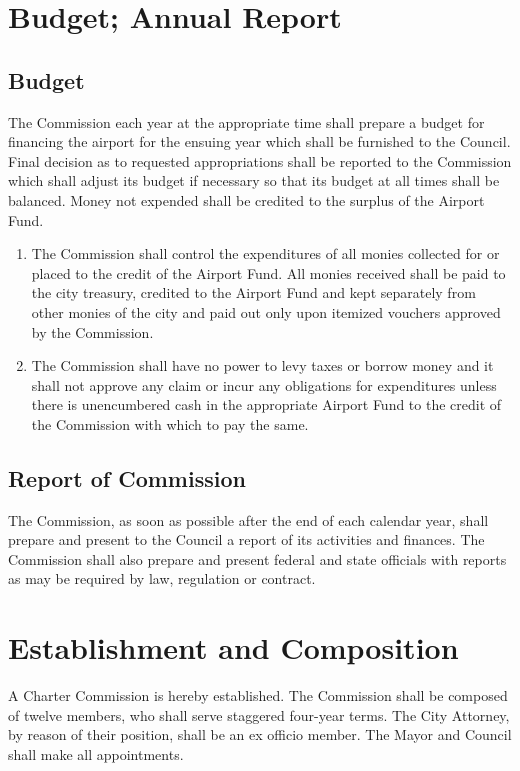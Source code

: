 \section{Budget; Annual Report}
\subsection{Budget}
The Commission each year at the appropriate time shall prepare a budget for financing the airport for the ensuing year which shall be furnished to the Council.  Final decision as to requested appropriations shall be reported to the Commission which shall adjust its budget if necessary so that its budget at all times shall be balanced.  Money not expended shall be credited to the surplus of the Airport Fund.
\begin{enumerate}
    \item The Commission shall control the expenditures of all monies collected for or placed to the credit of the Airport Fund.  All monies received shall be paid to the city treasury, credited to the Airport Fund and kept separately from other monies of the city and paid out only upon itemized vouchers approved by the Commission.
    \item The Commission shall have no power to levy taxes or borrow money and it shall not approve any claim or incur any obligations for expenditures unless there is unencumbered cash in the appropriate Airport Fund to the credit of the Commission with which to pay the same.
\end{enumerate}
\subsection{Report of Commission}
The Commission, as soon as possible after the end of each calendar year, shall prepare and present to the Council a report of its activities and finances.  The Commission shall also prepare and present federal and state officials with reports as may be required by law, regulation or contract.\\

\setcounter{section}{109}
\section{Establishment and Composition}
A Charter Commission is hereby established. The Commission shall be composed of twelve members, who shall serve staggered four-year terms.  The City Attorney, by reason of their position, shall be an ex officio member. The Mayor and Council shall make all appointments.

